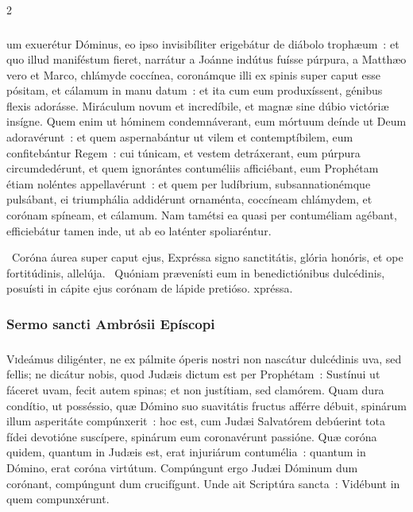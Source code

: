 \documentclass[9pt,twoside]{extarticle}
\begin{document}
\begin{multicols}{2}
{{\subsubsection*{\center {}}
um exuerétur Dóminus, eo ipso invisibíliter erigebátur de diábolo trophæum~: et quo illud maniféstum fieret, narrátur a Joánne indútus fuísse púrpura, a Matthæo vero et Marco, chlámyde coccínea, coronámque illi ex spinis super caput esse pósitam, et cálamum in manu datum~: et ita cum eum produxíssent, génibus flexis adorásse. Miráculum novum et incredíbile, et magnæ sine dúbio victóriæ insígne. Quem enim ut hóminem condemnáverant, eum mórtuum deínde ut Deum adoravérunt~: et quem aspernabántur ut vilem et contemptíbilem, eum confitebántur Regem~: cui túnicam, et vestem detráxerant, eum púrpura circumdedérunt, et quem ignorántes contuméliis afficiébant, eum Prophétam étiam noléntes appellavérunt~: et quem per ludíbrium, subsannationémque pulsábant, ei triumphália addidérunt ornaménta, coccíneam chlámydem, et corónam spíneam, et cálamum. Nam tamétsi ea quasi per contuméliam agébant, efficiebátur tamen inde, ut ab eo laténter spoliaréntur.

\begin{tightlist}{}
\item {}~Coróna áurea super caput ejus, \textred{*} Expréssa signo sanctitátis, glória honóris, et ope fortitúdinis, allelúja. ~Quóniam prævenísti eum in benedictiónibus dulcédinis, posuísti in cápite ejus corónam de lápide pretióso. xpréssa.
\end{tightlist}

\subsubsection*{\center Sermo sancti Ambrósii Epíscopi}
\subsubsection*{\center {}}
\lettrine{V}ideámus diligénter, ne ex pálmite óperis nostri non nascátur dulcédinis uva, sed fellis; ne dicátur nobis, quod Judæis dictum est per Prophétam~: Sustínui ut fáceret uvam, fecit autem spinas; et non justítiam, sed clamórem. Quam dura condítio, ut posséssio, quæ Dómino suo suavitátis fructus afférre débuit, spinárum illum asperitáte compúnxerit~: hoc est, cum Judæi Salvatórem debúerint tota fídei devotióne suscípere, spinárum eum coronavérunt passióne. Quæ coróna quidem, quantum in Judæis est, erat injuriárum contumélia~: quantum in Dómino, erat coróna virtútum. Compúngunt ergo Judæi Dóminum dum corónant, compúngunt dum crucifígunt. Unde ait Scriptúra sancta~: Vidébunt in quem compunxérunt.

}}
\end{multicols}
\end{document}
